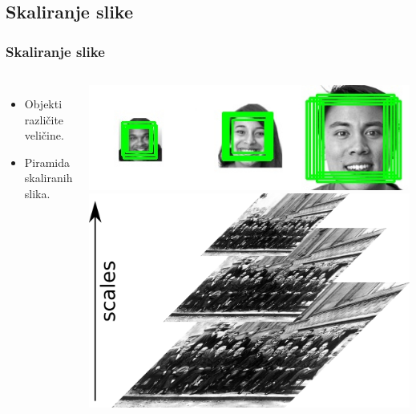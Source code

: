 \documentclass{beamer}
\begin{document}
\begin{frame}
\begin{columns}[onlytextwidth,T]
  \end{columns}
\end{frame}

\subsection{Skaliranje slike}
\begin{frame}
  \frametitle{Skaliranje slike}

  \begin{columns}[onlytextwidth,T]
    \column{\dimexpr\linewidth-60mm-2mm}
    \begin{itemize}
    \item<1-> Objekti različite veličine.
    \item<2-> Piramida skaliranih slika.
    \end{itemize}


    \column{80mm}
    \begin{overprint}
      \includegraphics[width=0.83\linewidth]{../images/sixfaces_scaled_res}
      \includegraphics[width=0.7\linewidth]{../images/image_pyramid}
    \end{overprint}

  \end{columns}
\end{frame}
\end{document}
